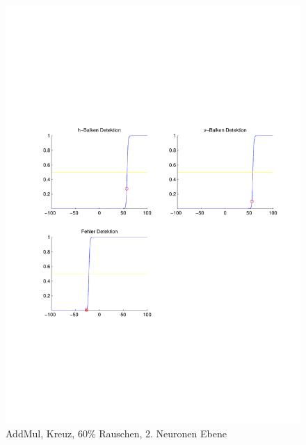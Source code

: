 \begin{figure}[hbt]
\begin{minipage}{0.8 \textwidth}
		\includegraphics[width=\textwidth]{./Bilder/Auswertung/Endergebnis/TypeAddMul_Rauschen60_Cross_Layer2}
		\caption{AddMul, Kreuz, 60\% Rauschen, 2. Neuronen Ebene}
		\label{AddMul_Kreuz_60_2}
	\end{minipage}
\end{figure}


